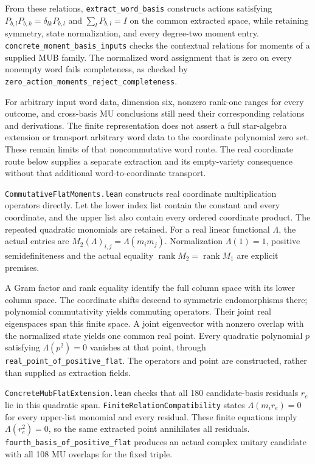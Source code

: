 \documentclass[
]{article}
\begin{document}
From these relations, \nolinkurl{extract_word_basis} constructs actions
satisfying \(P_{b,l}P_{b,k}=\delta_{lk}P_{b,l}\) and \(\sum_lP_{b,l}=I\)
on the common extracted space, while retaining symmetry, state
normalization, and every degree-two moment entry.
\nolinkurl{concrete_moment_basis_inputs} checks the contextual relations
for moments of a supplied MUB family. The normalized word assignment
that is zero on every nonempty word fails completeness, as checked by
\nolinkurl{zero_action_moments_reject_completeness}.

For arbitrary input word data, dimension six, nonzero rank-one ranges
for every outcome, and cross-basis MU conclusions still need their
corresponding relations and derivations. The finite representation does
not assert a full star-algebra extension or transport arbitrary word
data to the coordinate polynomial zero set. These remain limits of that
noncommutative word route. The real coordinate route below supplies a
separate extraction and its empty-variety consequence without that
additional word-to-coordinate transport.

\nolinkurl{CommutativeFlatMoments.lean} constructs real coordinate
multiplication operators directly. Let the lower index list contain the
constant and every coordinate, and the upper list also contain every
ordered coordinate product. The repeated quadratic monomials are
retained. For a real linear functional \(\Lambda\), the actual entries
are \(M_2(\Lambda)_{i,j}=\Lambda(m_i m_j)\). Normalization
\(\Lambda(1)=1\), positive semidefiniteness and the actual equality
\(\operatorname{rank}M_2=\operatorname{rank}M_1\) are explicit premises.

A Gram factor and rank equality identify the full column space with its
lower column space. The coordinate shifts descend to symmetric
endomorphisms there; polynomial commutativity yields commuting
operators. Their joint real eigenspaces span this finite space. A joint
eigenvector with nonzero overlap with the normalized state yields one
common real point. Every quadratic polynomial \(p\) satisfying
\(\Lambda(p^2)=0\) vanishes at that point, through
\nolinkurl{real_point_of_positive_flat}. The operators and point are
constructed, rather than supplied as extraction fields.

\nolinkurl{ConcreteMubFlatExtension.lean} checks that all 180
candidate-basis residuals \(r_e\) lie in this quadratic span.
\nolinkurl{FiniteRelationCompatibility} states \(\Lambda(m_i r_e)=0\)
for every upper-list monomial and every residual. These finite equations
imply \(\Lambda(r_e^2)=0\), so the same extracted point annihilates all
residuals. \nolinkurl{fourth_basis_of_positive_flat} produces an actual
complex unitary candidate with all 108 MU overlaps for the fixed triple.
\end{document}
